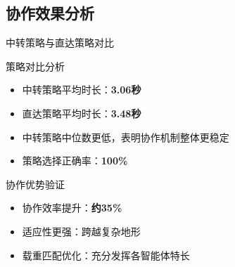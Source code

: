 \documentclass[
10pt,
aspectratio=169,
]{beamer}
\begin{document}
\subsection{协作效果分析}

\begin{frame}{中转策略与直达策略对比}
            \begin{alertblock}{策略对比分析}
                \begin{itemize}
                    \item 中转策略平均时长：\textbf{3.06秒}
                    \item 直达策略平均时长：\textbf{3.48秒}
                    \item 中转策略中位数更低，表明协作机制整体更稳定
                    \item 策略选择正确率：\textbf{100\%}
                \end{itemize}
            \end{alertblock}
            
            \begin{exampleblock}{协作优势验证}
                \begin{itemize}
                    \item 协作效率提升：\textbf{约35\%}
                    \item 适应性更强：跨越复杂地形
                    \item 载重匹配优化：充分发挥各智能体特长
                \end{itemize}
            \end{exampleblock}
\end{frame}
\end{document}
